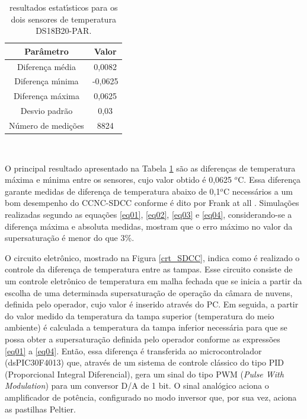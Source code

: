 \begin{table}[!htbp]
\centering \caption{\label{estatistica} resultados estat\'{\i}sticos para os dois sensores de temperatura DS18B20-PAR.}
\begin{tabular}{ c | c }
  \hline
  Par\^{a}metro & Valor\\
  \hline
  Diferen\c{c}a m\'{e}dia & 0,0082\\
  Diferen\c{c}a m\'{\i}nima & -0,0625\\
  Diferen\c{c}a m\'{a}xima & 0,0625\\
  Desvio padr\~{a}o & 0,03\\
  N\'{u}mero de medi\c{c}\~{o}es & 8824\\
  \hline
\end{tabular}\\
\end{table}


O principal resultado apresentado na Tabela \ref{estatistica} s\~{a}o as diferen\c{c}as de temperatura m\'{a}xima e m\'{\i}nima entre os sensores, cujo valor obtido \'{e} 0,0625 $^{o}$C. Essa diferen\c{c}a garante medidas de diferen\c{c}a de temperatura abaixo de 0,1$^{o}$C necess\'{a}rios a um bom desempenho do CCNC-SDCC conforme \'{e} dito por Frank at all \cite{Frank}. Simula\c{c}\~{o}es realizadas segundo as equa\c{c}\~{o}es \ref{eq01}, \ref{eq02}, \ref{eq03} e \ref{eq04}, considerando-se a diferen\c{c}a m\'{a}xima e absoluta medidas, mostram que o erro m\'{a}ximo no valor da supersatura\c{c}\~{a}o \'{e} menor do que 3\%.

O circuito eletr\^{o}nico, mostrado na Figura \ref{crt_SDCC}, indica como \'{e} realizado o controle da diferen\c{c}a de temperatura entre as tampas. Esse circuito consiste de um controle eletr\^{o}nico de temperatura em malha fechada que se inicia a partir da escolha de uma determinada  supersatura\c{c}\~{a}o de opera\c{c}\~{a}o da c\^{a}mara de nuvens, definida pelo operador, cujo valor \'{e} inserido atrav\'{e}s do PC. Em seguida, a partir do valor medido da temperatura da tampa superior (temperatura do meio ambiente) \'{e} calculada a temperatura da tampa inferior necess\'{a}ria para que se possa obter a supersatura\c{c}\~{a}o definida pelo operador conforme as express\~{o}es \ref{eq01} a \ref{eq04}. Ent\~{a}o, essa diferen\c{c}a \'{e}  transferida ao microcontrolador (dsPIC30F4013) que, atrav\'{e}s de um sistema de controle cl\'{a}ssico do tipo PID (Proporcional Integral Diferencial), gera um sinal do tipo PWM (\emph{Pulse With Modulation}) para um conversor D/A de 1 bit. O sinal anal\'{o}gico aciona o amplificador de pot\^{e}ncia, configurado no modo inversor que, por sua vez, aciona as pastilhas Peltier.


